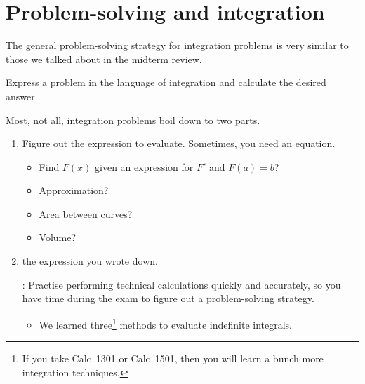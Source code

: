\documentclass[../main.tex]{subfiles}
\begin{document}
 \section{Problem-solving and integration}
The general problem-solving strategy for integration problems is very similar to those we talked about in the midterm review.

\begin{mdframed}[style=simple]
  Express a problem in the language of integration and calculate the desired answer. 
\end{mdframed}

Most, not all, integration problems boil down to two parts.
\begin{enumerate}[wide, label=\textbf{Part~\arabic*}.]
  \item Figure out the  expression to evaluate. Sometimes, you need an equation.

    \begin{itemize}[wide]
      \item Find \(F(x)\) given an expression for \(F'\) and \(F(a) = b\)?


      \item Approximation?  


      \item Area between curves?  


      \item Volume?  


    \end{itemize}

  \item {} the expression you wrote down. 

    : Practise performing technical calculations quickly and accurately, so you have time during the exam to figure out a problem-solving strategy.

    \begin{itemize}
      \item We learned three\footnote{If you take Calc~1301 or Calc~1501, then you will learn a bunch more integration techniques.} methods to evaluate indefinite integrals.


\end{itemize}
\end{enumerate}
\end{document}
